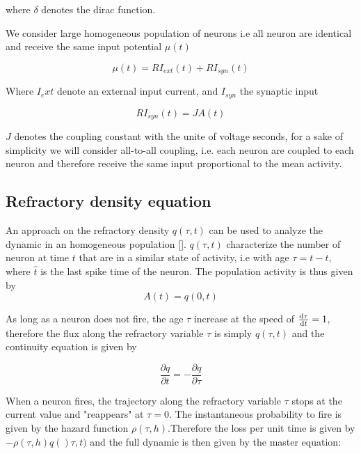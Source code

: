 \documentclass[12pt,twoside]{report}
\def \dd  {{\rm d}}
\begin{document}
where $\delta$ denotes the dirac function.

We consider large homogeneous population of neurons i.e all neuron are identical and receive the same input potential  $\mu(t)$

\begin{equation}
\label{eq:mu}
\mu(t)= RI_{ext}(t)+RI_{syn}(t)
\end{equation}

Where $I_ext$ denote an external input current, and $I_{syn}$ the synaptic input

\begin{equation}
\label{eq:input}
RI_{syn}(t)=JA(t)
\end{equation}

$J$ denotes the coupling constant with the unite of voltage seconds, for a sake of simplicity we will consider all-to-all coupling, i.e. each neuron are coupled to each neuron and therefore receive the same input proportional to the mean activity.


\subsection{Refractory density equation}

An approach on the refractory density $q(\tau,t) $ can be used to analyze the dynamic in an homogeneous population [\cite{GerKis02}]. $q(\tau,t)$ characterize the number of neuron at time $t$ that are in a similar state of activity, i.e with age $\tau=t-\hat{t}$, where $\hat{t}$ is the last spike time of the neuron. The  population activity is thus given by
\begin{equation}
\label{eq:A}
A(t)=q(0,t)
\end{equation}

As long as a neuron does not fire, the age $\tau$ increase at the speed of $\frac{\dd \tau}{\dd t}=1$, therefore the flux along the refractory variable $\tau$ is simply $q(\tau,t)$ and the continuity equation is given by

\begin{equation}
\label{eq:continuity1}
\frac{\partial q}{\partial t}=-\frac{\partial q}{\partial \tau}
\end{equation}

When a neuron fires, the trajectory along the refractory variable $\tau$ stops at the current value and "reappears" at $\tau=0$. The instantaneous probability to fire is given by the hazard function $\rho(\tau,h)$.Therefore the loss per unit time is given by $-\rho(\tau,h)q()\tau,t)$ and the full dynamic is then given by the master equation:
\end{document}
